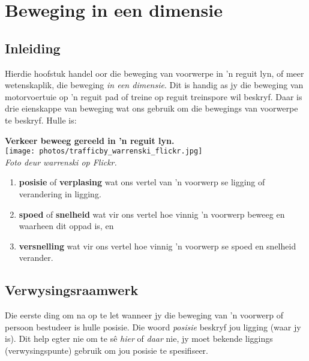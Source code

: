 \chapter{Beweging in een dimensie}
\label{chap:motion}
 
\section{Inleiding}

\begin{minipage}{.5\textwidth}
Hierdie hoofstuk handel oor die beweging van voorwerpe in 'n reguit lyn, of meer wetenskaplik, die beweging \textsl{in een dimensie}. Dit is handig as jy die beweging van motorvoertuie op 'n reguit pad of treine op reguit treinspore wil beskryf. Daar is drie eienskappe van beweging wat ons gebruik om die bewegings van voorwerpe te beskryf. Hulle is:\par
\end{minipage}
\begin{minipage}{.5\textwidth}
\begin{center}
\textbf{Verkeer beweeg gereeld in 'n reguit lyn.}\\
 \texttt{[image: photos/trafficby\_warrenski\_flickr.jpg]}\\
\textit{Foto deur warrenski op Flickr.}
\end{center}
\end{minipage}
   
\begin{enumerate}[noitemsep, label=\textbf{\arabic*}. ] 
    \item \textbf{posisie} of \textbf{verplasing} wat ons vertel van 'n voorwerp se ligging of verandering in ligging.
    \item \textbf{spoed} of \textbf{snelheid} wat vir ons vertel hoe vinnig 'n voorwerp beweeg en waarheen dit oppad is, en
    \item \textbf{versnelling} wat vir ons vertel hoe vinnig 'n voorwerp se spoed en snelheid verander. 
\end{enumerate}



\section{Verwysingsraamwerk}
Die eerste ding om na op te let wanneer jy die beweging van 'n voorwerp of persoon bestudeer is hulle posisie. Die woord \textsl{posisie} beskryf jou ligging (waar jy is). Dit help egter nie om te s\^e \textsl{hier} of \textsl{daar} nie, jy moet bekende liggings (verwysingspunte) gebruik om jou posisie te spesifiseer.


